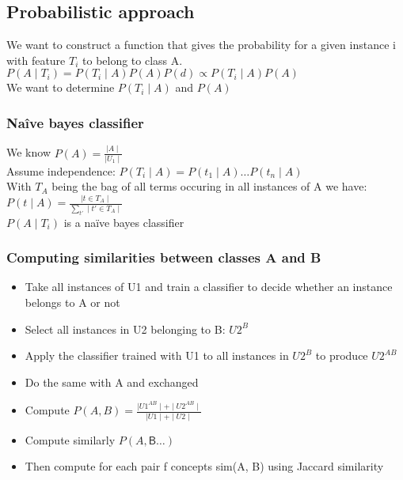 \subsection{Probabilistic approach}
We want to construct a function that gives the probability for a given
instance i with feature $ T_i $ to belong to class A. \\
$ P(A \mid T_i) = P(T_i \mid A)P(A)P(d) \propto P(T_i \mid A)P(A) $ \\
We want to determine $ P(T_i \mid A) $ and $ P(A) $

\subsubsection{Naîve bayes classifier}

We know $ P(A) = \frac{\mid A \mid}{\mid U_1 \mid}$ \\
Assume independence: $ P(T_i \mid A) = P(t_1 \mid A) \ldots P(t_n \mid
A) $ \\

With $ T_A $ being the bag of all terms occuring in all instances of A
we have: $ P(t \mid A) = \frac{\mid t \in T_A \mid}{\sum_{t'} \mid t'
  \in T_A \mid} $ \\

$ P(A \mid T_i) $ is a naïve bayes classifier

\subsubsection{Computing similarities between classes A and B}
\begin{itemize}
\item Take all instances of U1 and train a classifier to decide
  whether an instance belongs to A or not
\item Select all instances in U2 belonging to B: $ U2^B $
\item Apply the classifier trained with U1 to all instances in $ U2^B
  $ to produce $ U2^{AB} $
\item Do the same with A and exchanged
\item Compute $ P(A, B) = \frac{\mid U1^{AB} \mid + \mid U2^{AB}
    \mid}{\mid U1 \mid + \mid U2 \mid}$
\item Compute similarly $ P(A, \mathsf{B} \ldots)$
\item Then compute for each pair f concepts sim(A, B) using Jaccard similarity
\end{itemize}

